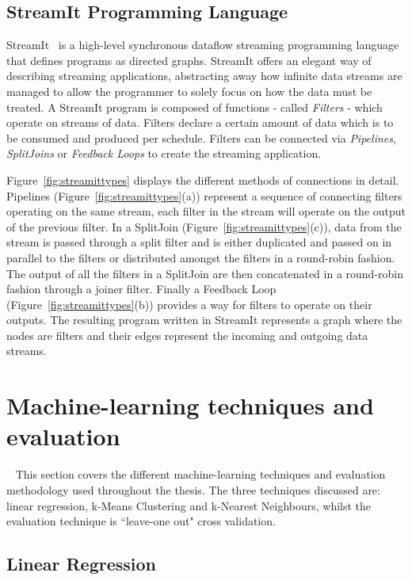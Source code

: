 \subsection{StreamIt Programming Language}\label{chp:bckg:streamit}
StreamIt~\cite{theis2002streamit} is a high-level synchronous dataflow streaming programming language that defines programs as directed graphs.
StreamIt offers an elegant way of describing streaming applications, abstracting away how infinite data streams are managed to allow the programmer to solely focus on how the data must be treated.
A StreamIt program is composed of functions - called \textit{Filters} - which operate on streams of data.
Filters declare a certain amount of data which is to be consumed and produced per schedule.
Filters can be connected via \textit{Pipelines}, \textit{SplitJoins} or \textit{Feedback Loops} to create the streaming application.

Figure~\ref{fig:streamittypes} displays the different methods of connections in detail.
Pipelines (Figure~\ref{fig:streamittypes}(a)) represent a sequence of connecting filters operating on the same stream, each filter in the stream will operate on the output of the previous filter.
In a SplitJoin (Figure~\ref{fig:streamittypes}(c)), data from the stream is passed through a split filter and is either duplicated and passed on in parallel to the filters or distributed amongst the filters in a round-robin fashion.
The output of all the filters in a SplitJoin are then concatenated in a round-robin fashion through a joiner filter.
Finally a Feedback Loop (Figure~\ref{fig:streamittypes}(b)) provides a way for filters to operate on their outputs.
The resulting program written in StreamIt represents a graph where the nodes are filters and their edges represent the incoming and outgoing data streams.

\section{Machine-learning techniques and evaluation}~\label{sec:ml}
This section covers the different machine-learning techniques and evaluation methodology used throughout the thesis.
The three techniques discussed are: linear regression, k-Means Clustering and k-Nearest Neighbours, whilst the evaluation technique is ``leave-one out" cross validation.

\subsection{Linear Regression}~\label{sec:lr}

